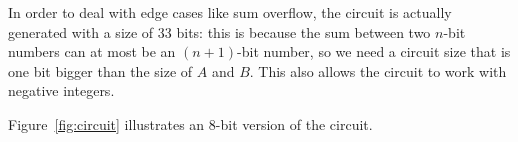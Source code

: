 In order to deal with edge cases like sum overflow, the circuit is actually generated with a size of 33 bits: this is because the sum between two $n$-bit numbers can at most be an $(n+1)$-bit number, so we need a circuit size that is one bit bigger than the size of $A$ and $B$. This also allows the circuit to work with negative integers.

Figure~\ref{fig:circuit} illustrates an 8-bit version of the circuit.